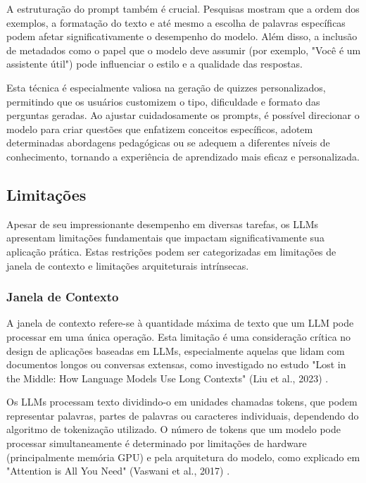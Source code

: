 \documentclass[tcc,capa]{texufpel}
\begin{document}
A estruturação do prompt também é crucial. Pesquisas mostram que a ordem dos exemplos, a formatação do texto e até mesmo a escolha de palavras específicas podem afetar significativamente o desempenho do modelo. Além disso, a inclusão de metadados como o papel que o modelo deve assumir (por exemplo, "Você é um assistente útil") pode influenciar o estilo e a qualidade das respostas.



Esta técnica é especialmente valiosa na geração de quizzes personalizados, permitindo que os usuários customizem o tipo, dificuldade e formato das perguntas geradas. Ao ajustar cuidadosamente os prompts, é possível direcionar o modelo para criar questões que enfatizem conceitos específicos, adotem determinadas abordagens pedagógicas ou se adequem a diferentes níveis de conhecimento, tornando a experiência de aprendizado mais eficaz e personalizada.

\subsection{Limitações}

Apesar de seu impressionante desempenho em diversas tarefas, os LLMs apresentam limitações fundamentais que impactam significativamente sua aplicação prática. Estas restrições podem ser categorizadas em limitações de janela de contexto e limitações arquiteturais intrínsecas.

\subsubsection{Janela de Contexto}

A janela de contexto refere-se à quantidade máxima de texto que um LLM pode processar em uma única operação. Esta limitação é uma consideração crítica no design de aplicações baseadas em LLMs, especialmente aquelas que lidam com documentos longos ou conversas extensas, como investigado no estudo "Lost in the Middle: How Language Models Use Long Contexts" (Liu et al., 2023) \cite{liu2023lost}.

Os LLMs processam texto dividindo-o em unidades chamadas tokens, que podem representar palavras, partes de palavras ou caracteres individuais, dependendo do algoritmo de tokenização utilizado. O número de tokens que um modelo pode processar simultaneamente é determinado por limitações de hardware (principalmente memória GPU) e pela arquitetura do modelo, como explicado em "Attention is All You Need" (Vaswani et al., 2017) \cite{vaswani2017attention}.
\end{document}
